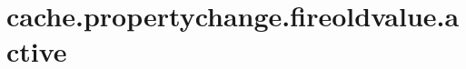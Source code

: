 \section{cache.propertychange.fireoldvalue.active}
\label{configuration:CachePropertychangeFireoldvalueActive}
\TODO
